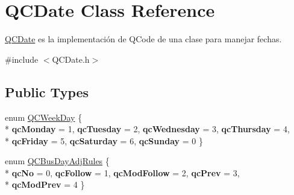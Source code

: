 \hypertarget{class_q_c_date}{\section{Q\+C\+Date Class Reference}
\label{class_q_c_date}
}


\hyperlink{class_q_c_date}{Q\+C\+Date} es la implementación de Q\+Code de una clase para manejar fechas.  




{\ttfamily \#include $<$Q\+C\+Date.\+h$>$}

\subsection*{Public Types}
\begin{DoxyCompactItemize}
\item 
enum \hyperlink{class_q_c_date_a19bc952d3dba68ce61881ec85837c7eb}{Q\+C\+Week\+Day} \{ \\*
{\bfseries qc\+Monday} = 1, 
{\bfseries qc\+Tuesday} = 2, 
{\bfseries qc\+Wednesday} = 3, 
{\bfseries qc\+Thursday} = 4, 
\\*
{\bfseries qc\+Friday} = 5, 
{\bfseries qc\+Saturday} = 6, 
{\bfseries qc\+Sunday} = 0
 \}
\item 
enum \hyperlink{class_q_c_date_a17e5b6c9a1a784f917c8e84045d7e362}{Q\+C\+Bus\+Day\+Adj\+Rules} \{ \\*
{\bfseries qc\+No} = 0, 
{\bfseries qc\+Follow} = 1, 
{\bfseries qc\+Mod\+Follow} = 2, 
{\bfseries qc\+Prev} = 3, 
\\*
{\bfseries qc\+Mod\+Prev} = 4
 \}
\end{DoxyCompactItemize}
